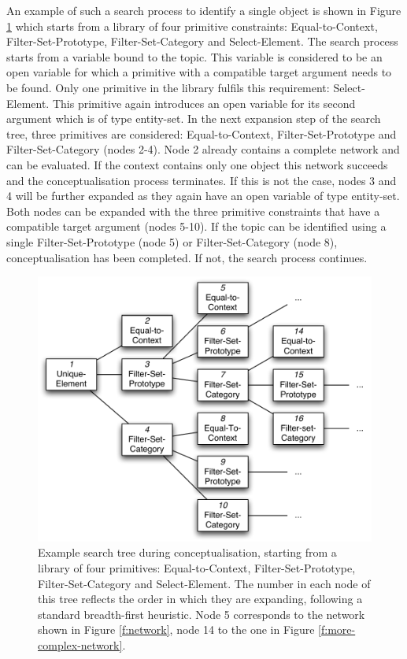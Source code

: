 An example of such a search process to identify a single object is
shown in Figure \ref{f:conceptualisation} which starts from a library
of four primitive constraints: {\sc Equal-to-Context}, {\sc
  Filter-Set-Prototype}, {\sc Filter-Set-Category} and {\sc
  Select-Element}. The search process starts from a variable bound to
the topic. This variable is considered to be an open variable for
which a primitive with a compatible target argument needs to be
found. Only one primitive in the library fulfils this requirement:
{\sc Select-Element}. This primitive again introduces an open variable
for its second argument which is of type entity-set. In the next
expansion step of the search tree, three primitives are considered:
{\sc Equal-to-Context}, {\sc Filter-Set-Prototype} and {\sc
  Filter-Set-Category} (nodes 2-4). Node 2 already contains a complete
network and can be evaluated. If the context contains only one object
this network succeeds and the conceptualisation process terminates. If
this is not the case, nodes 3 and 4 will be further expanded as they
again have an open variable of type entity-set. Both nodes can be
expanded with the three primitive constraints that have a compatible
target argument (nodes 5-10). If the topic can be identified using a
single {\sc Filter-Set-Prototype} (node 5) or {\sc
  Filter-Set-Category} (node 8), conceptualisation has been
completed. If not, the search process continues.

\begin{figure}
  \begin{center}
    \includegraphics[width=.75\textwidth]{./frameworks/figures/conceptualisation.pdf}
    \caption[Example of the conceptualisation process]{Example search
      tree during conceptualisation, starting from a library of four
      primitives: {\sc Equal-to-Context}, {\sc Filter-Set-Prototype},
      {\sc Filter-Set-Category} and {\sc Select-Element}. The number
      in each node of this tree reflects the order in which they are
      expanding, following a standard breadth-first heuristic. Node 5
      corresponds to the network shown in Figure \ref{f:network}, node
      14 to the one in Figure \ref{f:more-complex-network}.}
    \label{f:conceptualisation}
  \end{center}
\end{figure}

